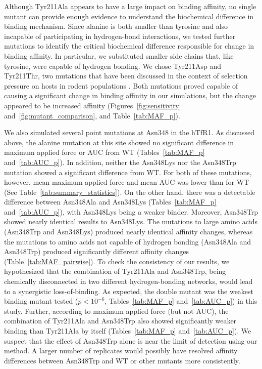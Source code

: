 \documentclass[12pt]{article}
\begin{document}
Although Tyr211Ala appears to have a large impact on binding affinity, no single mutant can provide enough evidence to understand the biochemical difference in binding mechanism. Since alanine is both smaller than tyrosine and also incapable of participating in hydrogen-bond interactions, we tested further mutations to identify the critical biochemical difference responsible for change in binding affinity. In particular, we substituted smaller side chains that, like tyrosine, were capable of hydrogen bonding. We chose Tyr211Asp and Tyr211Thr, two mutations that have been discussed in the context of selection pressure on hosts in rodent populations \citep{Rad2008,Rad20111,Rad20112}. Both mutations proved capable of causing a significant change in binding affinity in our simulations, but the change appeared to be increased affinity (Figures~\ref{fig:sensitivity} and~\ref{fig:mutant_comparison}, and Table~\ref{tab:MAF_p}).

We also simulated several point mutations at Asn348 in the hTfR1. As discussed above, the alanine mutation at this site showed no significant difference in maximum applied force or AUC from WT (Tables~\ref{tab:MAF_p} and~\ref{tab:AUC_p}). In addition, neither the Asn348Lys nor the Asn348Trp mutation showed a significant difference from WT. For both of these mutations, however, mean maximum applied force and mean AUC was lower than for WT (See Table~\ref{tab:summary_statistics}).  On the other hand, there was a detectable difference between Asn348Ala and Asn348Lys (Tables~\ref{tab:MAF_p} and~\ref{tab:AUC_p}), with Asn348Lys being a weaker binder. Moreover, Asn348Trp showed nearly identical results to Asn348Lys. The mutations to large amino acids (Asn348Trp and Asn348Lys) produced nearly identical affinity changes, whereas the mutations to amino acids not capable of hydrogen bonding (Asn348Ala and Asn348Trp) produced significantly different affinity changes (Table~\ref{tab:MAF_pairwise}). To check the consistency of our results, we hypothesized that the combination of Tyr211Ala and Asn348Trp, being chemically disconnected in two different hydrogen-bonding networks, would lead to a synergistic loss-of-binding. As expected, the double mutant was the weakest binding mutant tested ($ p < 10^{-6} $, Tables~\ref{tab:MAF_p} and~\ref{tab:AUC_p}) in this study. Further, according to maximum applied force (but not AUC), the combination of Tyr211Ala and Asn348Trp also showed significantly weaker binding than Tyr211Ala by itself (Tables~\ref{tab:MAF_p} and~\ref{tab:AUC_p}). We suspect that the effect of Asn348Trp alone is near the limit of detection using our method. A larger number of replicates would possibly have resolved affinity differences between Asn348Trp and WT or other mutants more consistently.
\end{document}
